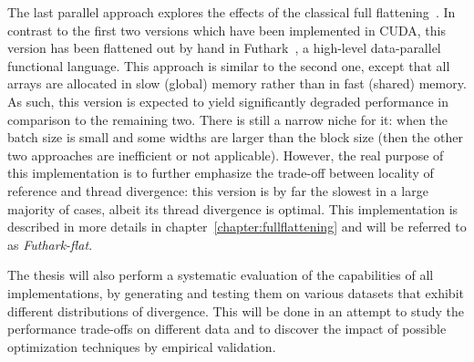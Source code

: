 The last parallel approach explores the effects of the classical full flattening~\cite{blelloch1994implementation}. In contrast to the first two versions which have been implemented in CUDA, this version has been flattened out by hand in Futhark~\cite{henriksen2017futhark}, a high-level data-parallel functional language. This approach is similar to the second one, except that all arrays are allocated in slow (global) memory rather than in fast (shared) memory. As such, this version is expected to yield significantly degraded performance in comparison to the remaining two. There is still a narrow niche for it: when the batch size is small and some widths are larger than the block size (then the other two approaches are inefficient or not applicable). However, the real purpose of this implementation is to further emphasize the trade-off between locality of reference and thread divergence: this version is by far the slowest in a large majority of cases, albeit its thread divergence is optimal. This implementation is described in more details in chapter~\ref{chapter:fullflattening} and will be referred to as \textit{Futhark-flat}.



The thesis will also perform a systematic evaluation of the capabilities of all implementations, by generating and testing them on various datasets that exhibit different distributions of divergence. This will be done in an attempt to study the performance trade-offs on different data and to discover the impact of possible optimization techniques by empirical validation.  

